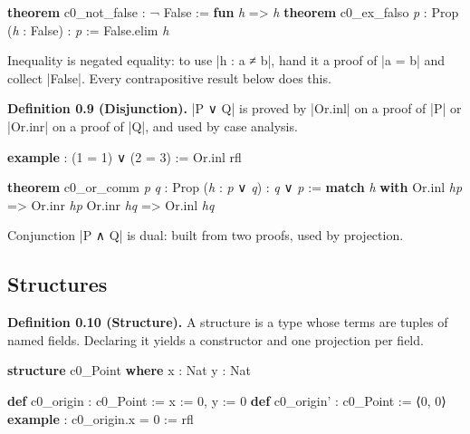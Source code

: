 \documentclass{memoir}
\begin{document}
\begin{LeanVerbatim}
\textbf{theorem} c0_not_false : ¬ False := \textbf{fun} \textit{h} => \textit{h}
\textbf{theorem} c0_ex_falso \textit{p} : Prop (\textit{h} : False) : \textit{p} :=
  False.elim \textit{h}

\end{LeanVerbatim}


Inequality is negated equality: to use \LeanVerb|h : a ≠ b|, hand it a proof of \LeanVerb|a = b|
and collect \LeanVerb|False|. Every contrapositive result below does this.

\textbf{Definition 0.9 (Disjunction).} \LeanVerb|P ∨ Q| is proved by \LeanVerb|Or.inl| on a proof of \LeanVerb|P|
or \LeanVerb|Or.inr| on a proof of \LeanVerb|Q|, and used by case analysis.

\begin{LeanVerbatim}
\textbf{example} : (1 = 1) ∨ (2 = 3) := Or.inl rfl

\textbf{theorem} c0_or_comm \textit{p} \textit{q} : Prop (\textit{h} : \textit{p} ∨ \textit{q}) : \textit{q} ∨ \textit{p} :=
  \textbf{match} \textit{h} \textbf{with}
   Or.inl \textit{hp} => Or.inr \textit{hp}
   Or.inr \textit{hq} => Or.inl \textit{hq}

\end{LeanVerbatim}


Conjunction \LeanVerb|P ∧ Q| is dual: built from two proofs, used by projection.



\subsection{Structures}\label{Two--Schemas--of--Impossibility-005F-005F-005F--Machine--Checked--Limits--of--Trustworthy--Machine--Learning-005F-005F-005F--and--Why--They--Tighten--with--Capability----Preliminaries----How--to--read--the--Lean--4----Structures}

\textbf{Definition 0.10 (Structure).} A structure is a type whose terms are tuples of
named fields. Declaring it yields a constructor and one projection per field.

\begin{LeanVerbatim}
\textbf{structure} c0_Point \textbf{where}
  x : Nat
  y : Nat

\textbf{def} c0_origin : c0_Point :=  x := 0, y := 0 
\textbf{def} c0_origin' : c0_Point := ⟨0, 0⟩
\textbf{example} : c0_origin.x = 0 := rfl

\end{LeanVerbatim}
\end{document}
